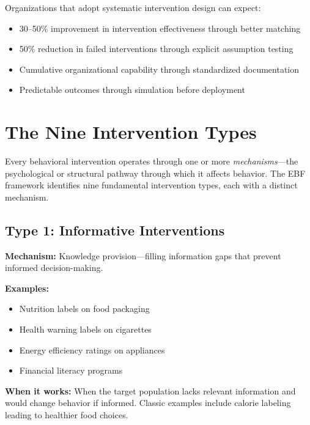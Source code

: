 \begin{tcolorbox}[colback=blue!5!white, colframe=blue!75!black,
    title=The Promise of Systematic Design]
Organizations that adopt systematic intervention design can expect:
\begin{itemize}[nosep]
\item 30--50\% improvement in intervention effectiveness through better matching
\item 50\% reduction in failed interventions through explicit assumption testing
\item Cumulative organizational capability through standardized documentation
\item Predictable outcomes through simulation before deployment
\end{itemize}
\end{tcolorbox}


\section{The Nine Intervention Types}
\label{sec:17-types}

Every behavioral intervention operates through one or more \textit{mechanisms}---the psychological or structural pathway through which it affects behavior. The EBF framework identifies nine fundamental intervention types, each with a distinct mechanism.

\subsection{Type 1: Informative Interventions}

\textbf{Mechanism:} Knowledge provision---filling information gaps that prevent informed decision-making.

\textbf{Examples:}
\begin{itemize}[nosep]
\item Nutrition labels on food packaging
\item Health warning labels on cigarettes
\item Energy efficiency ratings on appliances
\item Financial literacy programs
\end{itemize}

\textbf{When it works:} When the target population lacks relevant information and would change behavior if informed. Classic examples include calorie labeling leading to healthier food choices.

